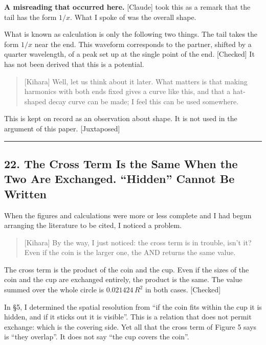 \documentclass[
  a4paper,
]{article}
\begin{document}
\textbf{A misreading that occurred here.} {[}Claude{]} took this as a
remark that the tail has the form \(1/x\). What I spoke of was the
overall shape.

What is known as calculation is only the following two things. The tail
takes the form \(1/x\) near the end. This waveform corresponds to the
partner, shifted by a quarter wavelength, of a peak set up at the single
point of the end. {[}Checked{]} It has not been derived that this is a
potential.

\begin{quote}
{[}Kihara{]} Well, let us think about it later. What matters is that
making harmonics with both ends fixed gives a curve like this, and that
a hat-shaped decay curve can be made; I feel this can be used somewhere.
\end{quote}

This is kept on record as an observation about shape. It is not used in
the argument of this paper. {[}Juxtaposed{]}

\begin{center}\rule{0.5\linewidth}{0.5pt}\end{center}

\subsection{22. The Cross Term Is the Same When the Two Are Exchanged.
``Hidden'' Cannot Be
Written}\label{the-cross-term-is-the-same-when-the-two-are-exchanged.-hidden-cannot-be-written}

When the figures and calculations were more or less complete and I had
begun arranging the literature to be cited, I noticed a problem.

\begin{quote}
{[}Kihara{]} By the way, I just noticed: the cross term is in trouble,
isn't it? Even if the coin is the larger one, the AND returns the same
value.
\end{quote}

The cross term is the product of the coin and the cup. Even if the sizes
of the coin and the cup are exchanged entirely, the product is the same.
The value summed over the whole circle is \(0.021424\,R^2\) in both
cases. {[}Checked{]}

In §5, I determined the spatial resolution from ``if the coin fits
within the cup it is hidden, and if it sticks out it is visible''. This
is a relation that does not permit exchange: which is the covering side.
Yet all that the cross term of Figure 5 says is ``they overlap''. It
does not say ``the cup covers the coin''.
\end{document}
